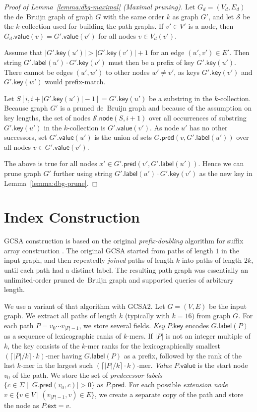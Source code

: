 \documentclass[a4paper,11pt]{llncs}
\newcommand{\set}[1]{\ensuremath{\{ #1 \}}}
\newcommand{\abs}[1]{\ensuremath{\lvert #1 \rvert}}
\newcommand{\glabel}{\ensuremath{\mathsf{label}}}
\newcommand{\gpred}{\ensuremath{\mathsf{pred}}}
\newcommand{\gkey}{\ensuremath{\mathsf{key}}}
\newcommand{\gvalue}{\ensuremath{\mathsf{value}}}
\newcommand{\gnode}{\ensuremath{\mathsf{node}}}
\newcommand{\gext}{\ensuremath{\mathsf{ext}}}
\newcommand{\kmer}[1]{$#1$\nobreakdash-mer}
\newcommand{\kcollection}[1]{$#1$\nobreakdash-collection}
\begin{document}
\begin{proof}[Proof of Lemma~\ref{lemma:dbg-maximal} (Maximal pruning)]
Let $G_{d} = (V_{d}, E_{d})$ the de~Bruijn graph of graph $G$ with the same order $k$ as graph $G'$, and let $\mathcal{S}$ be the \kcollection{k} used for building the path graphs. If $v' \in V'$ is a node, then $G_{d}.\gvalue(v) = G'.\gvalue(v')$ for all nodes $v \in V_{d}(v')$.

Assume that $\abs{G'.\gkey(u')} > \abs{G'.\gkey(v')}+1$ for an edge $(u', v') \in E'$. Then string $G'.\glabel(u') \cdot G'.\gkey(v')$ must then be a prefix of key $G'.\gkey(u')$. There cannot be edges $(u', w')$ to other nodes $w' \ne v'$, as keys $G'.\gkey(v')$ and $G'.\gkey(w')$ would prefix-match.

Let $S[i, i+\abs{G'.\gkey(u')}-1] = G'.\gkey(u')$ be a substring in the \kcollection{k}. Because graph $G'$ is a pruned de~Bruijn graph and because of the assumption on key lengths, the set of nodes $\mathcal{S}.\gnode(S, i+1)$ over all occurrences of substring $G'.\gkey(u')$ in the \kcollection{k} is $G'.\gvalue(v')$. As node $u'$ has no other successors, set $G'.\gvalue(u')$ is the union of sets $G.\gpred(v, G'.\glabel(u'))$ over all nodes $v \in G'.\gvalue(v')$.

The above is true for all nodes $x' \in G'.\gpred(v', G'.\glabel(u'))$. Hence we can prune graph $G'$ further using string $G'.\glabel(u') \cdot G'.\gkey(v')$ as the new key in Lemma~\ref{lemma:dbg-prune}.
\end{proof}


\section{Index Construction}\label{appendix:construction}

GCSA construction \cite{Siren2014} is based on the original \emph{prefix-doubling} algorithm for suffix array construction \cite{Manber1993}. The original GCSA started from paths of length $1$ in the input graph, and then repeatedly \emph{joined} paths of length $k$ into paths of length $2k$, until each path had a distinct label. The resulting path graph was essentially an unlimited-order pruned de~Bruijn graph and supported queries of arbitrary length.

We use a variant of that algorithm with GCSA2. Let $G = (V, E)$ be the input graph. We extract all paths of length $k$ (typically with $k = 16$) from graph $G$. For each path $P = v_{0} \dotsm v_{\abs{P}-1}$, we store several fields. \emph{Key} $P.\gkey$ encodes $G.\glabel(P)$ as a sequence of lexicographic ranks of \kmer{k}s. If $\abs{P}$ is not an integer multiple of $k$, the key consists of the \kmer{k} ranks for the lexicographically smallest \kmer{(\lceil \abs{P}/k \rceil \cdot k)} having $G.\glabel(P)$ as a prefix, followed by the rank of the last \kmer{k} in the largest such \kmer{(\lceil \abs{P}/k \rceil \cdot k)}. \emph{Value} $P.\gvalue$ is the start node $v_{0}$ of the path. We store the set of \emph{predecessor labels} $\set{c \in \Sigma \mid \abs{G.\gpred(v_{0}, c)} > 0}$ as $P.\gpred$. For each possible \emph{extension node} $v \in \set{v \in V \mid (v_{\abs{P}-1}, v) \in E}$, we create a separate copy of the path and store the node as $P.\gext = v$.
\end{document}
